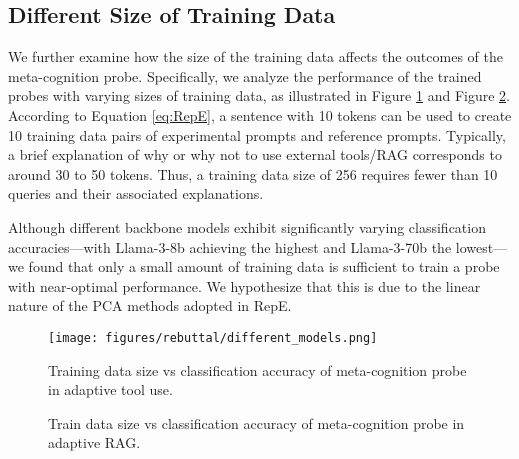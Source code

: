 \subsection{Different Size of Training Data}
We further examine how the size of the training data affects the outcomes of the meta-cognition probe. Specifically, we analyze the performance of the trained probes with varying sizes of training data, as illustrated in Figure \ref{fig:probe_n_train} and Figure \ref{fig:probe_n_train_rag}. According to Equation \ref{eq:RepE}, a sentence with 10 tokens can be used to create 10 training data pairs of experimental prompts and reference prompts. Typically, a brief explanation of why or why not to use external tools/RAG corresponds to around 30 to 50 tokens. Thus, a training data size of 256 requires fewer than 10 queries and their associated explanations.

Although different backbone models exhibit significantly varying classification accuracies—with Llama-3-8b achieving the highest and Llama-3-70b the lowest—we found that only a small amount of training data is sufficient to train a probe with near-optimal performance. We hypothesize that this is due to the linear nature of the PCA methods adopted in RepE.

\begin{figure}[ht]
  \centering
  \texttt{[image: figures/rebuttal/different\_models.png]}
  \caption{Training data size vs classification accuracy of meta-cognition probe in adaptive tool use.}
  \label{fig:probe_n_train}
\end{figure}


\begin{figure}[ht]
    \centering
    \hfill
    \caption{Train data size vs classification accuracy of meta-cognition probe in adaptive RAG.}
    \label{fig:probe_n_train_rag}
\end{figure}



